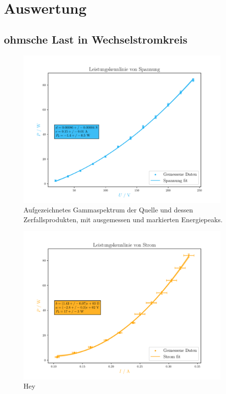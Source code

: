 \documentclass[12pt,english,ngerman]{scrartcl}
\begin{document}

\section{Auswertung}
\label{sec:auswertung}

\subsection{ohmsche Last in Wechselstromkreis}
\begin{figure}[H]
	\begin{center}
		\includegraphics[width = 0.95\textwidth]{figures/pUkennlinie.pdf}
	\end{center}
	\caption[Energiespektrum der $\gamma$-Strahlung einer  Probe]{
		Aufgezeichnetes Gammaspektrum der  Quelle und dessen
		Zerfallsprodukten, mit ausgemessen und markierten Energiepeaks.
	}\label{fig:pUkennlinie}
\end{figure}

\begin{figure}[H]
	\begin{center}
		\includegraphics[width = 0.95\textwidth]{figures/pIkennlinie.pdf}
	\end{center}
	\caption[Stromabhängige Leistungskurve einer Glühbirne]{ Hey
	}\label{fig:pIkennlinie}
\end{figure}
\end{document}
